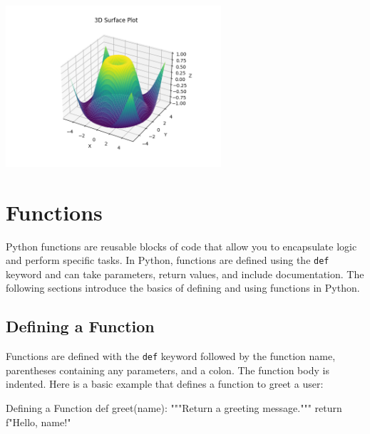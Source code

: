\begin{codeonly}{}

\end{codeonly}

\begin{center}
   \includegraphics[width=0.6\textwidth]{images/plot-3d-surface.png}
\end{center}%

%
\section{Functions}

Python functions are reusable blocks of code that allow you to encapsulate logic and perform specific tasks. In Python, functions are defined using the \texttt{def} keyword and can take parameters, return values, and include documentation. The following sections introduce the basics of defining and using functions in Python.

%
\subsection{Defining a Function}
Functions are defined with the \texttt{def} keyword followed by the function name, parentheses containing any parameters, and a colon. The function body is indented. Here is a basic example that defines a function to greet a user:

\begin{codeonly}{Defining a Function}
def greet(name):
    """Return a greeting message."""
    return f"Hello, {name}!"
\end{codeonly}

